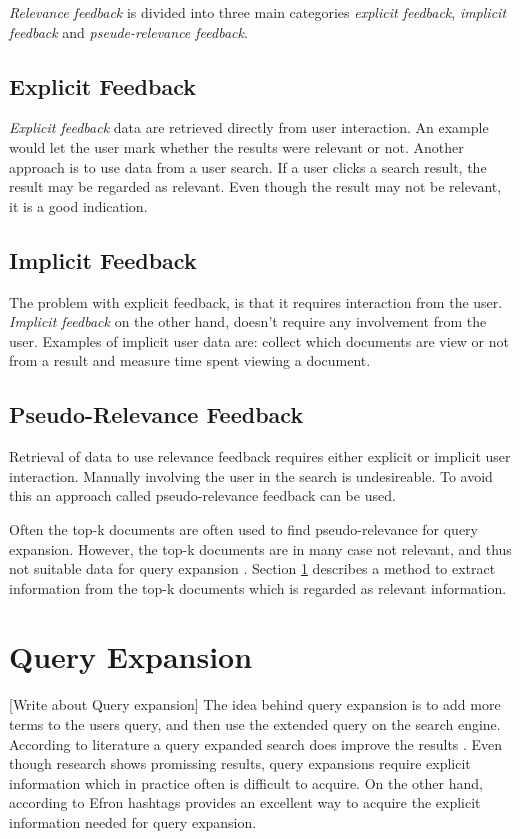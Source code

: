 \textit{Relevance feedback} is divided into three main categories \textit{explicit feedback}, \textit{implicit feedback} and \textit{pseude-relevance feedback}.

\subsection{Explicit Feedback}
\textit{Explicit feedback} data are retrieved directly from user interaction.
An example would let the user mark whether the results were relevant or not.
Another approach is to use data from a user search.
If a user clicks a search result, the result may be regarded as relevant.
Even though the result may not be relevant, it is a good indication.

\subsection{Implicit Feedback}
The problem with explicit feedback, is that it requires interaction from the user.
\textit{Implicit feedback} on the other hand, doesn't require any involvement from the user.
Examples of implicit user data are:
collect which documents are view or not from a result and measure time spent viewing a document.

\subsection{Pseudo-Relevance Feedback}
Retrieval of data to use relevance feedback requires either explicit or implicit user interaction.
Manually involving the user in the search is undesireable.
To avoid this an approach called pseudo-relevance feedback can be used.

Often the top-k documents are often used to find pseudo-relevance for query expansion.
However, the top-k documents are in many case not relevant, and thus not suitable data for query expansion \cite{pseudo-relevance-invalid}.
Section \ref{sec:query-expansion} describes a method to extract information from the top-k documents which is regarded as relevant information.

\section{Query Expansion}
\label{sec:query-expansion}
[Write about Query expansion]
The idea behind query expansion is to add more terms to the users query, and then use the extended query on the search engine.
According to literature a query expanded search does improve the results \cite[ch. 5]{ir-book}.
Even though research shows promissing results, query expansions require explicit information which in practice often is difficult to acquire.
On the other hand, according to Efron \cite{ir-hashtag} hashtags provides an excellent way to acquire the explicit information needed for query expansion.

